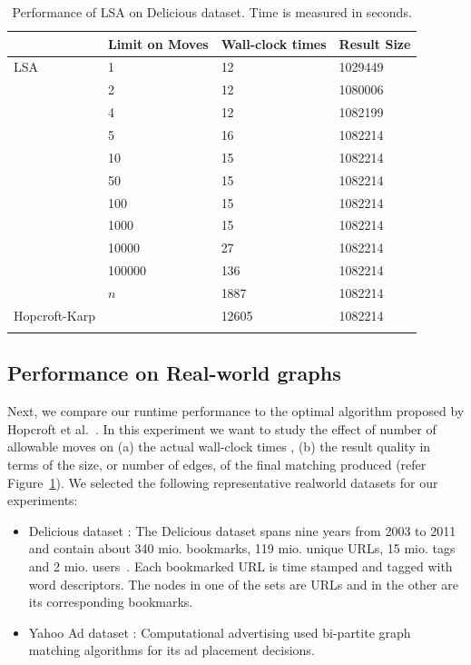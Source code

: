 \begin{table}[ht!]
\centering
\footnotesize
\begin{tabular}{@{}l l l l @{}}
\toprule
\multicolumn{1}{l}{} & Limit on Moves                  & Wall-clock times     & Result Size  \\
\hline \noalign{\smallskip}
LSA        &   1      & 12    & 1029449  \\
       &   2      & 12    & 1080006  \\
        &   4      & 12    & 1082199  \\
        &   5      & 16    & 1082214  \\
        &   10      & 15    & 1082214  \\
        &   50     & 15    & 1082214  \\
        &   100     & 15    & 1082214  \\
        &   1000     & 15    & 1082214  \\
        &   10000    & 27    & 1082214  \\
        &   100000    & 136    & 1082214  \\
        &   $n$    & 1887    & 1082214  \\
\midrule

Hopcroft-Karp                &  & 12605 & 1082214 \\

\hline \noalign{\smallskip}
\end{tabular}
\caption{Performance of LSA on \textsf{Delicious} dataset. Time is measured in seconds.}
\label{table:softlabel}
\end{table}

\subsection{Performance on Real-world graphs}

Next, we compare our runtime performance to the optimal algorithm proposed by Hopcroft et al.~\cite{hopcroft1973n}. In this experiment we want to study the effect of number of allowable moves on (a) the actual wall-clock times , (b) the result quality in terms of the size, or number of edges, of the final matching produced (refer Figure~\ref{table:softlabel}). We selected the following representative realworld datasets for our experiments:

\begin{itemize}
  \item \textsf{Delicious dataset : } The \textsf{Delicious} dataset spans nine years from 2003 to 2011 and contain about 340 mio. bookmarks, 119 mio. unique URLs, 15 mio. tags and 2 mio. users~\cite{zubiaga2013harnessing}. Each bookmarked URL is time stamped and tagged with word descriptors. The nodes in one of the sets are URLs and in the other are its corresponding bookmarks.

  \item \textsf{Yahoo Ad dataset : } Computational advertising used bi-partite graph matching algorithms for its ad placement decisions. 
\end{itemize}

